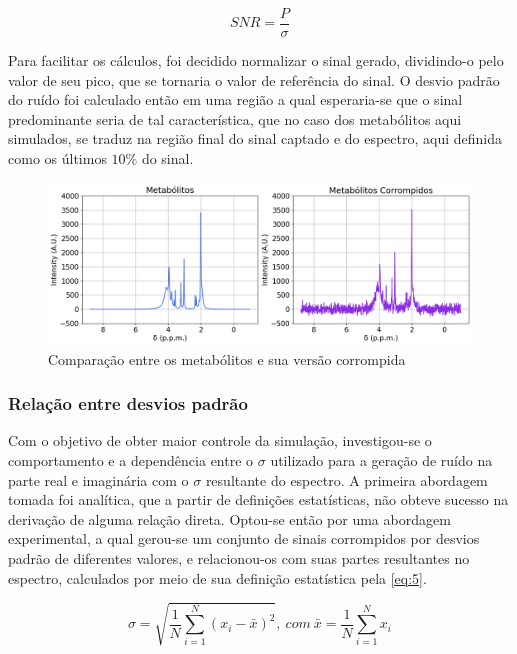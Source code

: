 \documentclass[
12pt,		
twoside, 
a4paper,
chapter=TITLE,
english,			
brazil]{USPSC-classe/USPSC}
\begin{document}
\begin{equation} \label{eq:2}
    SNR = \frac{P}{\sigma}
\end{equation}

Para facilitar os cálculos, foi decidido normalizar o sinal gerado, dividindo-o pelo valor de seu pico, que se tornaria o valor de referência do sinal. O desvio padrão do ruído foi 
calculado então em uma região a qual esperaria-se que o sinal predominante seria de tal característica, que no caso dos metabólitos aqui simulados, se traduz na região final do sinal captado e do espectro, 
aqui definida como os últimos $10\%$ do sinal.

\begin{figure} [H]
    \includegraphics[scale=0.37]{metabolitos-corrompidos.png}
    \centering
    \caption{Comparação entre os metabólitos e sua versão corrompida}
    \label{fig:5}
\end{figure}

\subsubsection{Relação entre desvios padrão}

Com o objetivo de obter maior controle da simulação, investigou-se o comportamento e a dependência entre o $\sigma$ utilizado para a geração de ruído na parte real e imaginária com o $\sigma$ resultante do espectro. A primeira abordagem 
tomada foi analítica, que a partir de definições estatísticas, não obteve sucesso na derivação de alguma relação direta. Optou-se então por uma abordagem experimental, a qual gerou-se um conjunto de sinais 
corrompidos por desvios padrão de diferentes valores, e relacionou-os com suas partes resultantes no espectro, calculados por meio de sua definição 
estatística pela \autoref{eq:5}.

\begin{equation} \label{eq:5}
    \sigma = \sqrt{\frac{1}{N} \sum_{i=1}^{N} (x_i - \bar{x})^2}, \ com \ \bar{x} = \frac{1}{N} \sum_{i = 1}^{N} x_i  
\end{equation}
\end{document}
